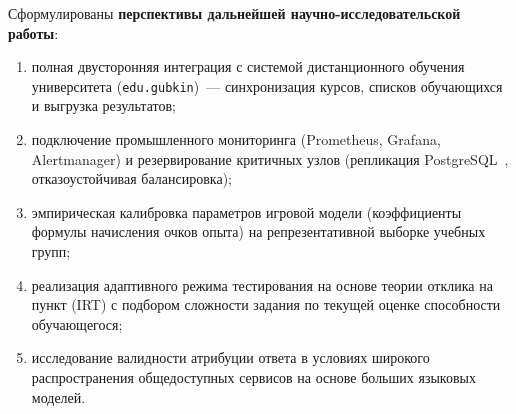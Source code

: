 \documentclass[14pt, a4paper]{extarticle}
\begin{document}
Сформулированы \textbf{перспективы дальнейшей научно-исследовательской работы}:
\begin{enumerate}
    \item полная двусторонняя интеграция с системой дистанционного обучения университета (\texttt{edu.gubkin})~--- синхронизация курсов, списков обучающихся и выгрузка результатов;
    \item подключение промышленного мониторинга (Prometheus, Grafana, Alertmanager) и резервирование критичных узлов (репликация PostgreSQL~\cite{postgresql_docs}, отказоустойчивая балансировка);
    \item эмпирическая калибровка параметров игровой модели (коэффициенты формулы начисления очков опыта) на репрезентативной выборке учебных групп;
    \item реализация адаптивного режима тестирования на основе теории отклика на пункт (IRT) с подбором сложности задания по текущей оценке способности обучающегося;
    \item исследование валидности атрибуции ответа в условиях широкого распространения общедоступных сервисов на основе больших языковых моделей.
\end{enumerate}

\newpage

\thispagestyle{plain}
{}
\printbibliography[title={СПИСОК ЛИТЕРАТУРЫ}]
\thispagestyle{plain}
\end{document}
